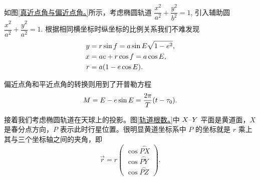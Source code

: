 \documentclass[UTF8, 12pt, a4paper, oneside, onecolumn, fontset=none]{ctexart}
\begin{document}
如图\ref{真近点角与偏近点角。}所示，考虑椭圆轨道 $\dfrac{x^{2}}{a^{2}}+\dfrac{y^{2}}{b^{2}}=1$, 引入辅助圆 $\dfrac{x^{2}}{a^{2}}+\dfrac{y^{2}}{a^{2}}=1$. 根据相同横坐标时纵坐标的比例关系我们不难发现
\begin{align}
y&=r\sin{f}=a\sin{E}\sqrt{1-e^{2}},\label{4.1.4}\\
x&=ae+r\cos{f}=a\cos{E},\label{4.1.5}\\
r&=a\mleft(1-e\cos{E}\mright).
\end{align}

偏近点角和平近点角的转换则用到了开普勒方程
\begin{equation}
M=E-e\sin{E}=\frac{2\pi}{T}\mleft(t-\tau_{0}\mright).
\end{equation}

接着我们考虑椭圆轨道在天球上的投影。图\ref{轨道根数。}中 $X\text{\textendash}Y$ 平面是黄道面，$X$ 是春分点方向，$P$ 表示此时行星位置。很明显黄道坐标系中 $P$ 的坐标就是 $r$ 乘上其与三个坐标轴之间的夹角，即
\begin{equation}
\vec{r}=r\begin{pmatrix}
\cos{\overset{\frown}{PX}}\\
\cos{\overset{\frown}{PY}}\\
\cos{\overset{\frown}{PZ}}
\end{pmatrix}.
\end{equation}
\end{document}
